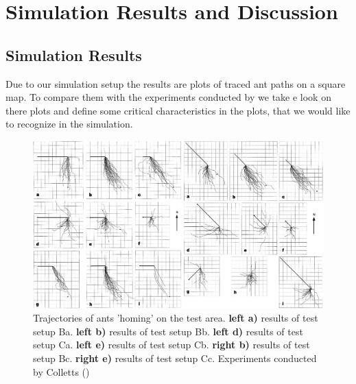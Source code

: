 \documentclass[11pt]{article}
\begin{document}
\section{Simulation Results and Discussion}
	\subsection{Simulation Results} %
		Due to our simulation setup the results are plots of traced ant paths on a square map. To compare them with the experiments conducted by \cite{wehner} we take e look on there plots and define some critical characteristics in the plots, that we would like to recognize in the simulation. 
\begin{figure}[H]
	\includegraphics[width=1\textwidth]{p1-2.png}
	\caption{Trajectories of ants 'homing' on the test area. \textbf{left a)} results of test setup Ba. \textbf{left b)} results of test setup Bb. \textbf{left d)} results of test setup Ca.  \textbf{left e)} results of test setup Cb. \textbf{right b)} results of test setup Bc.  \textbf{right e)} results of test setup Cc. Experiments conducted by Colletts (\cite{wehner})}
	\label{fig:results experiment test B and C}
\end{figure}
\end{document}
